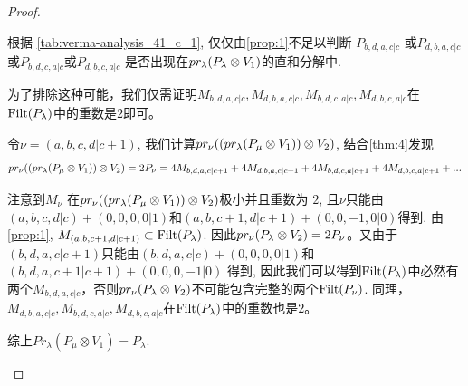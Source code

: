 \begin{proof}
\begin{enumerate}
\begin{enumerate}
\begin{enumerate}
根据 \cref{tab:verma-analysis_41_c_1}, 仅仅由\cref{prop:1}不足以判断 $P_{b,d,a,c|c}$ 或$P_{d,b,a,c|c}$或$P_{b,d,c,a|c}$或$P_{d,b,c,a|c}$ 是否出现在$pr_\lambda(P_\lambda \otimes V_{1})$的直和分解中.

为了排除这种可能，我们仅需证明$M_{b,d,a,c|c},M_{d,b,a,c|c},M_{b,d,c,a|c},M_{d,b,c,a|c}$在$\operatorname{Filt}(P_{\lambda})$中的重数是$2$即可。

令$\nu = (a,b,c,d|c+1)$, 我们计算$pr_\nu ( ( pr_\lambda(P_\mu \otimes V_{1}) ) \otimes V_2 )$, 结合\cref{thm:4}发现
\begin{equation}\notag
  \begin{aligned}
  pr_\nu ( ( pr_\lambda(P_\mu \otimes V_{1}) ) \otimes V_2 ) =
  2P_\nu = 4M_{b,d,a,c|c+1} + 4M_{d,b,a,c|c+1} +4M_{b,d,c,a|c+1} + 4M_{d,b,c,a|c+1}+ ...
  \end{aligned}
\end{equation}

注意到$M_\nu$ 在$pr_\nu ( ( pr_\lambda(P_\mu \otimes V_{1}) ) \otimes V_2 )$极小并且重数为 $2$, 且$\nu$只能由$ (a,b,c,d|c) + (0,0,0,0|1)$和$ (a,b,c+1,d|c+1) + (0,0,-1,0|0)$得到.
由\cref{prop:1}, $M_{(a,b,c+1,d|c+1)}\subset \operatorname{Filt}(P_\lambda)$.
因此$pr_\nu(P_\lambda \otimes V_2) = 2P_\nu$。又由于$(b,d,a,c|c+1)$只能由$(b,d,a,c|c) + (0,0,0,0|1)$和$(b,d,a,c+1|c+1) + (0,0,0,-1|0)$ 得到, 因此我们可以得到$\operatorname{Filt}(P_{\lambda})$中必然有两个$M_{b,d,a,c|c}$，否则$pr_\nu(P_\lambda \otimes V_2)$不可能包含完整的两个$\operatorname{Filt}(P_\nu)$. 同理，$M_{d,b,a,c|c},M_{b,d,c,a|c},M_{d,b,c,a|c}$在$\operatorname{Filt}(P_{\lambda})$中的重数也是$2$。

综上$Pr_{\lambda}(P_\mu \otimes V_{1}) = P_\lambda  $.


\end{enumerate}
\end{enumerate}
\end{enumerate}
\end{proof}
